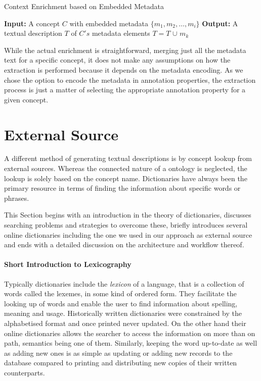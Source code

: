 \documentclass[draft,final]{vutinfth} %
\begin{document}
\begin{algorithm}
	\caption{Context Enrichment based on Embedded Metadata}\label{alg:embedded_enrichment}
	\begin{algorithmic}[1]
		\newline
			\textbf{Input:} A concept $C$ with embedded metadata $\{m_1, m_2, \ldots, m_i \}$\newline
			\textbf{Output:} A textual description $T$ of $C's$ metadata elements\newline
				\State $T=T$ $\cup$ $m_k$
			\EndFor
		\EndProcedure
	\end{algorithmic}
\end{algorithm}

While the actual enrichment is straightforward, merging just all the metadata text for a specific concept, it does not make any assumptions on how the extraction is performed because it depends on the metadata encoding. As we chose the option to encode the metadata in annotation properties, the extraction process is just a matter of selecting the appropriate annotation property for a given concept. 

\section{External Source}\label{sec:external_source}
A different method of generating textual descriptions is by concept lookup from external sources. Whereas the connected nature of a ontology is neglected, the lookup is solely based on the concept name. Dictionaries have always been the primary resource in terms of finding the information about specific words or phrases.

This Section begins with an introduction in the theory of dictionaries, discusses searching problems and strategies to overcome these, briefly introduces several online dictionaries including the one we used in our approach as external source and ends with a detailed discussion on the architecture and workflow thereof. 

\paragraph{Short Introduction to Lexicography}
Typically dictionaries include the \textit{lexicon} of a language, that is a collection of words called the lexemes, in some kind of ordered form. They facilitate the looking up of words and enable the user to find information about spelling, meaning and usage. Historically written dictionaries were constrained by the alphabetised format and once printed never updated. On the other hand their online dictionaries allows the searcher to access the information on more than on path, semantics being one of them. Similarly, keeping the word up-to-date as well as adding new ones is as simple as updating or adding new records to the database compared to printing and distributing new copies of their written counterparts. 
\end{document}
